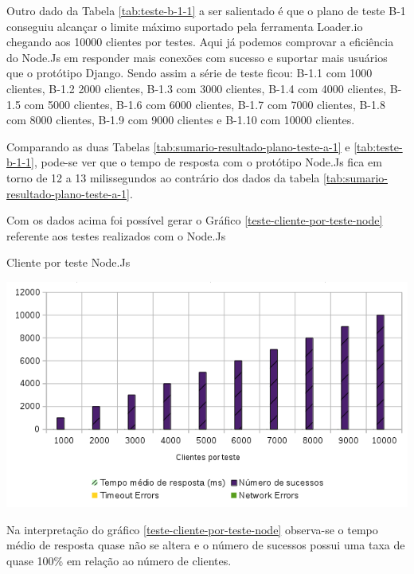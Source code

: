   Outro dado da Tabela \ref{tab:teste-b-1-1} a ser salientado é que o plano de teste B-1 conseguiu alcançar o limite máximo suportado pela ferramenta
  Loader.io chegando aos 10000 clientes por testes. Aqui já podemos comprovar a eficiência do Node.Js em responder mais conexões com sucesso e suportar
  mais usuários que o protótipo Django. Sendo assim a série de teste ficou: B-1.1 com 1000 clientes, B-1.2 2000 clientes,
  B-1.3 com 3000 clientes, B-1.4 com 4000 clientes, B-1.5 com 5000 clientes, B-1.6 com 6000 clientes, B-1.7 com 7000 clientes,
  B-1.8 com 8000 clientes, B-1.9 com 9000 clientes e B-1.10 com 10000 clientes.

  Comparando as duas Tabelas \ref{tab:sumario-resultado-plano-teste-a-1} e \ref{tab:teste-b-1-1}, pode-se ver que
  o tempo de resposta com o protótipo Node.Js fica em torno de 12 a 13 milissegundos ao contrário dos dados da tabela \ref{tab:sumario-resultado-plano-teste-a-1}.

  Com os dados acima foi possível gerar o Gráfico \ref{teste-cliente-por-teste-node} referente aos testes
  realizados com o Node.Js

  \begin{grafico}[H]
    \setlength{\abovecaptionskip}{5pt}
    \setlength{\belowcaptionskip}{0pt}
  
    \caption[Cliente por teste Node.Js]
	    {Cliente por teste Node.Js}
    \centering
    \includegraphics[width=.80\textwidth]{imagem/graficos/grafico_node_plano_de_teste_1.png}
    \captionsetup[grafico]{justification=centering}
    \label{teste-cliente-por-teste-node}
  \end{grafico}

  Na interpretação do gráfico \ref{teste-cliente-por-teste-node}  observa-se o tempo médio de resposta quase não se altera
  e o número de sucessos possui uma taxa de quase 100\% em relação ao número de clientes.

